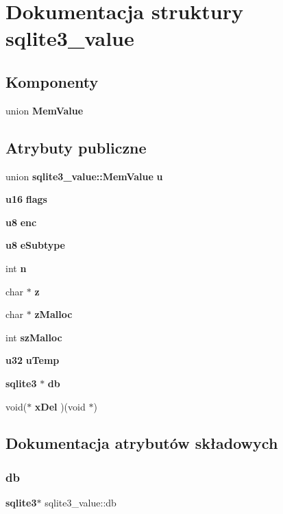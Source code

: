 \section{Dokumentacja struktury sqlite3\+\_\+value}
\label{structsqlite3__value}
\subsection*{Komponenty}
\begin{DoxyCompactItemize}
\item 
union \textbf{ Mem\+Value}
\end{DoxyCompactItemize}
\subsection*{Atrybuty publiczne}
\begin{DoxyCompactItemize}
\item 
union \textbf{ sqlite3\+\_\+value\+::\+Mem\+Value} \textbf{ u}
\item 
\textbf{ u16} \textbf{ flags}
\item 
\textbf{ u8} \textbf{ enc}
\item 
\textbf{ u8} \textbf{ e\+Subtype}
\item 
int \textbf{ n}
\item 
char $\ast$ \textbf{ z}
\item 
char $\ast$ \textbf{ z\+Malloc}
\item 
int \textbf{ sz\+Malloc}
\item 
\textbf{ u32} \textbf{ u\+Temp}
\item 
\textbf{ sqlite3} $\ast$ \textbf{ db}
\item 
void($\ast$ \textbf{ x\+Del} )(void $\ast$)
\end{DoxyCompactItemize}


\subsection{Dokumentacja atrybutów składowych}
\mbox{\label{structsqlite3__value_ab4dab30fa8816d3bf668df2b2fbfaebd}} 
\subsubsection{db}
{\footnotesize\ttfamily \textbf{ sqlite3}$\ast$ sqlite3\+\_\+value\+::db}

\mbox{\label{structsqlite3__value_a2b0d5eac4e14a699c8b58c593d25dce7}} 

